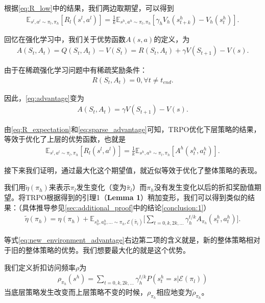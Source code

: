 根据\eqref{eq:R_low}中的结果，我们两边取期望，可以得到
\begin{align}
  \mathbb{E}_{s^l, a^l \sim \pi_l, \pi_h}[R_l(s^l, a^l)] = \frac{1}{k} \mathbb{E}_{s^h, a^h \sim \pi_l, \pi_h}[\gamma_h V_h(s_{t + k}^h) - V_h(s_{t}^h)].
  \label{eq:R_expectation}
\end{align}

回忆在强化学习中，我们关于优势函数$A(s, a)$的定义，为
\begin{align}
  A(S_t, A_t) = Q(S_t, A_t) - V(S_t) = R(S_t, A_t) + \gamma V(S_{t + 1}) - V(s).
  \label{eq:advantage}
\end{align}

由于在稀疏强化学习问题中有稀疏奖励条件：
\begin{align}
  R(S_t, A_t) = 0, \forall t \neq t_{end}.
  \label{eq:sparse_reward_condition}
\end{align}

因此，\eqref{eq:advantage}变为
\begin{align}
  A(S_t, A_t) = \gamma V(S_{t + 1}) - V(s).
  \label{eq:sparse_advantage}
\end{align}

由\eqref{eq:R_expectation}和\eqref{eq:sparse_advantage}可知，TRPO优化下层策略的结果，等效于优化了上层的优势函数，也就是
\begin{align}
  \mathbb{E}_{s^l, a^l \sim \pi_l, \pi_h}[R_l(s^l, a^l)] = \frac{1}{k} \mathbb{E}_{s^h, a^h \sim \pi_l, \pi_h}[A^h(s_t^h, a_t^h)].
  \label{eq:R_expectation_is_advantage}
\end{align}

接下来我们证明，通过最大化这个期望值，就近似等效于优化了整体策略的表现。

我们用$\tilde{\eta}(\pi_h)$来表示$\pi_l$发生变化（变为$\tilde{\pi_l}$）而$\pi_h$没有发生变化以后的折扣奖励值期望。将TRPO根据\cite{TRPO_pre}得到的引理1（\textbf{Lemma 1}）稍加变形，我们可以得到类似的结果：（具体推导参见\ref{sec:additional_proof}中的结论\ref{conclusion:1}）
\begin{align}
  \tilde{\eta}(\pi_h) = \eta(\pi_h) + \mathbb{E}_{s_0^h, a_0^h, ... \sim \pi_h, \mathcal{E}(\tilde{\pi_l})}\Bigg[\sum_{t=0,k,2k,...} \gamma_h^{t/k} A_{\pi_h}(s_t^h, a_t^h)\Bigg].
  \label{eq:new_environment_advantage}
\end{align}

等式\eqref{eq:new_environment_advantage}右边第二项的含义就是，新的整体策略相对于旧的整体策略的优势。我们想要最大化的就是这个优势。

我们定义折扣访问频率$\rho$为
\begin{align}
  \rho_{\pi_h}(s^h) = \sum_{t = 0, k, 2k, ...}\gamma_h^{t/k}P(s_t^h = s|\mathcal{E}(\pi_l))
  \label{eq:discounted_visitation_freq}
\end{align}
当底层策略发生改变而上层策略不变的时候，$\rho_{\pi_h}$相应地变为$\tilde{\rho}_{\pi_h}$。

